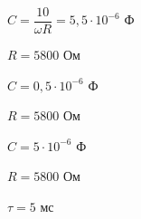 \begin{enumerate}
\begin{multicols}{3}
\begin{center}

$ C = \dfrac{10}{\omega R} = 5,5 \cdot 10^{-6} $ Ф

$ R = 5800 $ Ом

$ C = 0,5 \cdot 10^{-6} $ Ф

$ R = 5800 $ Ом

$ C = 5 \cdot 10^{-6} $ Ф

$ R = 5800 $ Ом

\end{center}
\end{multicols}

\vspace{30mm}

\begin{multicols}{3}
\begin{center}

$ \tau = 5 $ мс

\end{center}
\end{multicols}



\end{enumerate}

\clearpage
